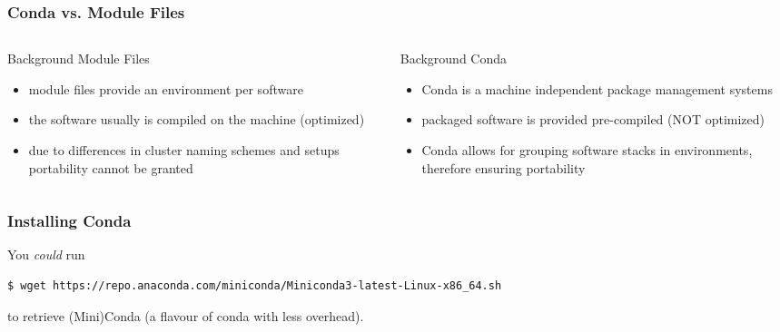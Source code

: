 \begin{frame}
  \frametitle{Conda vs. Module Files}
  \begin{columns}
    \begin{column}{0.5\textwidth}
      Background Module Files
      \begin{itemize}
       \item module files provide an environment per software
       \item the software usually is compiled on the machine (optimized)
       \item due to differences in cluster naming schemes and setups portability cannot be granted
      \end{itemize}
    \end{column}
    \begin{column}{0.5\textwidth}
      Background Conda
      \begin{itemize}
       \item Conda is a machine independent package management systems
       \item packaged software is provided pre-compiled (NOT optimized)
       \item Conda allows for grouping software stacks in environments, therefore ensuring portability
      \end{itemize}
    \end{column}
  \end{columns}
\end{frame}


\begin{frame}[fragile]
  \frametitle{Installing Conda}
  You \emph{could} run
  \begin{lstlisting}[language=Bash, style=Shell, basicstyle=\small,breaklines=true ]
$ wget https://repo.anaconda.com/miniconda/Miniconda3-latest-Linux-x86_64.sh
  \end{lstlisting}
  to retrieve (Mini)Conda (a flavour of conda with less overhead).
  \pause
\end{frame} 

